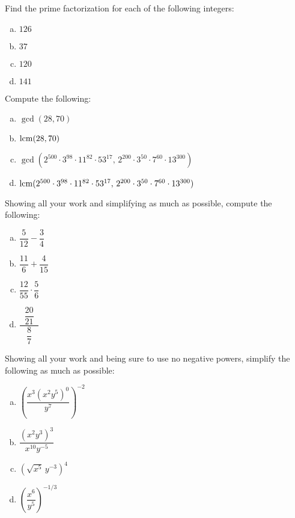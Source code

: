 \documentclass[12pt,letterpaper]{exam}
\begin{document}
\begin{questions}
\question[8] Find the prime factorization for each of the following integers: \pspace
        \begin{enumerate}[(a)]
        \item $126$ \vfill
        \item $37$ \vfill
        \item $120$ \vfill
        \item $141$ \vfill
        \end{enumerate}



\newpage



\question[8] Compute the following: \pspace
        \begin{enumerate}[(a)]
        \item $\gcd(28, 70)$ \vfill
        \item $\operatorname{lcm}(28, 70)$ \vfill
        \item $\gcd(2^{500} \cdot 3^{98} \cdot 11^{82} \cdot 53^{17},\, 2^{200} \cdot 3^{50} \cdot 7^{60} \cdot 13^{300})$ \vfill
        \item $\operatorname{lcm}(2^{500} \cdot 3^{98} \cdot 11^{82} \cdot 53^{17},\, 2^{200} \cdot 3^{50} \cdot 7^{60} \cdot 13^{300})$ \vfill
        \end{enumerate}



\newpage



\question[8] Showing all your work and simplifying as much as possible, compute the following: \pspace
	\begin{enumerate}[(a)]
	\item $\dfrac{5}{12} - \dfrac{3}{4}$ \vfill
	\item $\dfrac{11}{6} + \dfrac{4}{15}$ \vfill
	\item $\dfrac{12}{55} \cdot \dfrac{5}{6}$ \vfill
	\item $\dfrac{\;\;\dfrac{20}{21}\;\;}{\dfrac{8}{7}}$ \vfill
	\end{enumerate}



\newpage



\question[8] Showing all your work and being sure to use no negative powers, simplify the following as much as possible: \pspace
	\begin{enumerate}[(a)]
	\item $\left( \dfrac{x^3 (x^2y^5)^0}{y^7} \right)^{-2}$ \vfill
	\item $\dfrac{(x^2 y^3)^3}{x^{10} y^{-5}}$ \vfill
	\item $(\sqrt{x^5}\, y^{-3})^4$ \vfill
	\item $\left( \dfrac{x^6}{y^5} \right)^{-1/3}$ \vfill
	\end{enumerate}




\end{questions}
\end{document}
